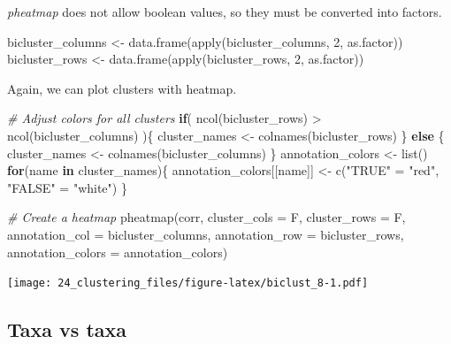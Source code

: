 \documentclass[
]{book}
\newenvironment{Shaded}{\begin{snugshade}}{\end{snugshade}}
\newcommand{\AttributeTok}[1]{\textcolor[rgb]{0.77,0.63,0.00}{#1}}
\newcommand{\CommentTok}[1]{\textcolor[rgb]{0.56,0.35,0.01}{\textit{#1}}}
\newcommand{\ControlFlowTok}[1]{\textcolor[rgb]{0.13,0.29,0.53}{\textbf{#1}}}
\newcommand{\DecValTok}[1]{\textcolor[rgb]{0.00,0.00,0.81}{#1}}
\newcommand{\FunctionTok}[1]{\textcolor[rgb]{0.00,0.00,0.00}{#1}}
\newcommand{\NormalTok}[1]{#1}
\newcommand{\OtherTok}[1]{\textcolor[rgb]{0.56,0.35,0.01}{#1}}
\newcommand{\SpecialCharTok}[1]{\textcolor[rgb]{0.00,0.00,0.00}{#1}}
\newcommand{\StringTok}[1]{\textcolor[rgb]{0.31,0.60,0.02}{#1}}
\begin{document}
\emph{pheatmap} does not allow boolean values, so they must be converted into factors.

\begin{Shaded}
\begin{Highlighting}[]
\NormalTok{bicluster\_columns }\OtherTok{\textless{}{-}} \FunctionTok{data.frame}\NormalTok{(}\FunctionTok{apply}\NormalTok{(bicluster\_columns, }\DecValTok{2}\NormalTok{, as.factor))}
\NormalTok{bicluster\_rows }\OtherTok{\textless{}{-}} \FunctionTok{data.frame}\NormalTok{(}\FunctionTok{apply}\NormalTok{(bicluster\_rows, }\DecValTok{2}\NormalTok{, as.factor))}
\end{Highlighting}
\end{Shaded}

Again, we can plot clusters with heatmap.

\begin{Shaded}
\begin{Highlighting}[]
\CommentTok{\# Adjust colors for all clusters}
\ControlFlowTok{if}\NormalTok{( }\FunctionTok{ncol}\NormalTok{(bicluster\_rows) }\SpecialCharTok{\textgreater{}} \FunctionTok{ncol}\NormalTok{(bicluster\_columns) )\{}
\NormalTok{  cluster\_names }\OtherTok{\textless{}{-}} \FunctionTok{colnames}\NormalTok{(bicluster\_rows)}
\NormalTok{\} }\ControlFlowTok{else}\NormalTok{ \{}
\NormalTok{  cluster\_names }\OtherTok{\textless{}{-}} \FunctionTok{colnames}\NormalTok{(bicluster\_columns)}
\NormalTok{\}}
\NormalTok{annotation\_colors }\OtherTok{\textless{}{-}} \FunctionTok{list}\NormalTok{()}
\ControlFlowTok{for}\NormalTok{(name }\ControlFlowTok{in}\NormalTok{ cluster\_names)\{}
\NormalTok{  annotation\_colors[[name]] }\OtherTok{\textless{}{-}} \FunctionTok{c}\NormalTok{(}\StringTok{"TRUE"} \OtherTok{=} \StringTok{"red"}\NormalTok{, }\StringTok{"FALSE"} \OtherTok{=} \StringTok{"white"}\NormalTok{)}
\NormalTok{\}}

\CommentTok{\# Create a heatmap}
\FunctionTok{pheatmap}\NormalTok{(corr, }\AttributeTok{cluster\_cols =}\NormalTok{ F, }\AttributeTok{cluster\_rows =}\NormalTok{ F,}
         \AttributeTok{annotation\_col =}\NormalTok{ bicluster\_columns, }
         \AttributeTok{annotation\_row =}\NormalTok{ bicluster\_rows,}
         \AttributeTok{annotation\_colors =}\NormalTok{ annotation\_colors)}
\end{Highlighting}
\end{Shaded}

\texttt{[image: 24\_clustering\_files/figure-latex/biclust\_8-1.pdf]}

\hypertarget{taxa-vs-taxa}{%
\subsection{Taxa vs taxa}\label{taxa-vs-taxa}}
\end{document}
